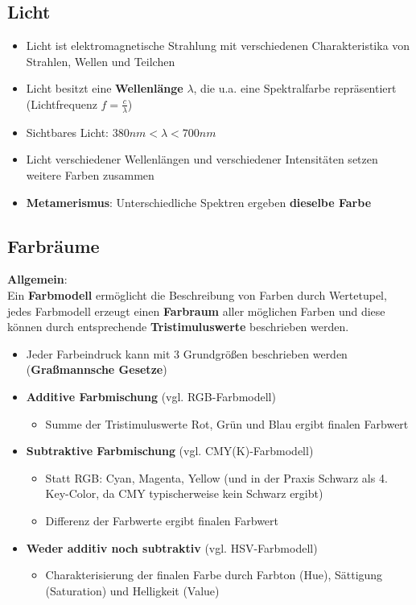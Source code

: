 \documentclass[10pt,a4paper]{article}
\begin{document}
	\subsection{Licht}
	\label{bfp:sub:licht}

	\begin{itemize}
		\item Licht ist elektromagnetische Strahlung mit verschiedenen Charakteristika von Strahlen, Wellen und Teilchen
		\item Licht besitzt eine \textbf{Wellenlänge} $\lambda$, die u.a. eine Spektralfarbe repräsentiert\\(Lichtfrequenz $f = \frac{c}{\lambda}$)
		\item Sichtbares Licht: $380nm < \lambda < 700nm$
		\item Licht verschiedener Wellenlängen und verschiedener Intensitäten setzen weitere Farben zusammen
		\item \textbf{Metamerismus}: Unterschiedliche Spektren ergeben \textbf{dieselbe Farbe}
        \end{itemize}

    \newpage
	\subsection{Farbräume}
	\label{bfp:sub:farbraeume}

	\textbf{Allgemein}:\\
	Ein \textbf{Farbmodell} ermöglicht die Beschreibung von Farben durch Wertetupel, jedes Farbmodell erzeugt einen \textbf{Farbraum} aller möglichen Farben und diese können durch entsprechende \textbf{Tristimuluswerte} beschrieben werden.

	\begin{itemize}
		\item Jeder Farbeindruck kann mit 3 Grundgrößen beschrieben werden (\textbf{Graßmannsche Gesetze})
		\item \textbf{Additive Farbmischung} (vgl. RGB-Farbmodell)
		\begin{itemize}
			\item Summe der Tristimuluswerte Rot, Grün und Blau ergibt finalen Farbwert
		\end{itemize}
		\item \textbf{Subtraktive Farbmischung} (vgl. CMY(K)-Farbmodell)
		\begin{itemize}
			\item Statt RGB: Cyan, Magenta, Yellow (und in der Praxis Schwarz als 4. Key-Color, da CMY typischerweise kein Schwarz ergibt)
			\item Differenz der Farbwerte ergibt finalen Farbwert
		\end{itemize}
		\item \textbf{Weder additiv noch subtraktiv} (vgl. HSV-Farbmodell)
		\begin{itemize}
			\item Charakterisierung der finalen Farbe durch Farbton (Hue), Sättigung (Saturation) und Helligkeit (Value)
		\end{itemize}
	\end{itemize}
\end{document}
